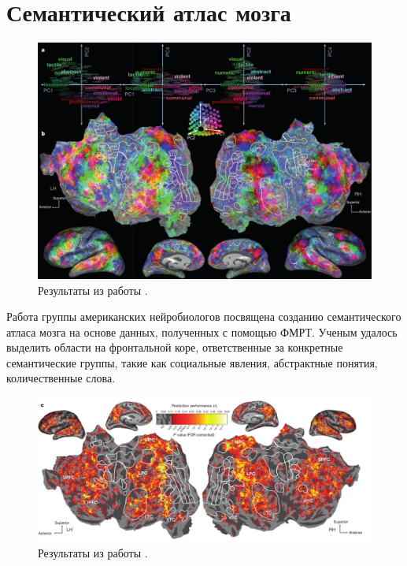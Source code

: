 \documentclass[pdftex,ptm,12pt,a4paper]{report}
\theoremstyle{definition}
\begin{document}
\section{Семантический атлас мозга}\label{complex}

\begin{figure}[h]
\includegraphics[scale=0.4]{images/galant_results.png}
\centering
\caption{Результаты из работы \cite{huth2016natural}.}
\label{huth_result}
\end{figure}

Работа \cite{huth2016natural} группы американских нейробиологов посвящена созданию семантического атласа мозга на основе данных, полученных с помощью ФМРТ. Ученым удалось выделить области на фронтальной коре, ответственные за конкретные семантические группы, такие как социальные явления, абстрактные понятия, количественные слова. 

\begin{figure}[h]
\includegraphics[scale=0.37]{images/map_result_huth.png}
\centering
\caption{Результаты из работы \cite{huth2016natural}.}
\label{map_huth_result}
\end{figure}
\end{document}
